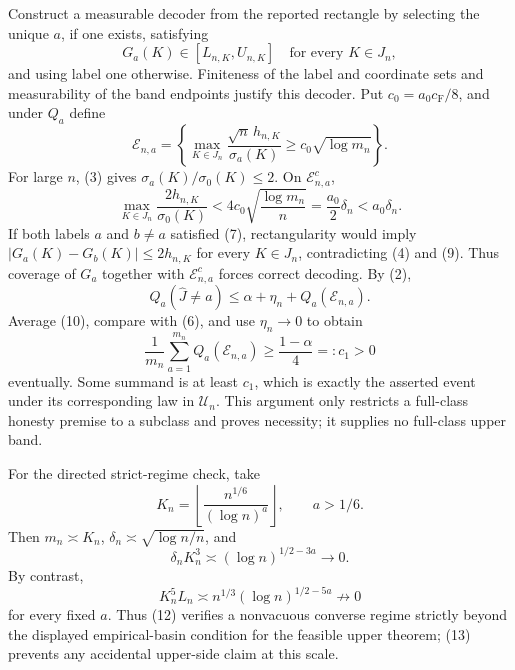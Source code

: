 Construct a measurable decoder from the reported rectangle by selecting the unique \(a\), if one exists, satisfying
\[
 G_a(K)\in[L_{n,K},U_{n,K}]\quad\text{for every }K\in J_n,                              \tag{7}
\]
and using label one otherwise.  Finiteness of the label and coordinate sets and measurability of the band endpoints justify this decoder.  Put \(c_0=a_0c_{\mathrm F}/8\), and under \(Q_a\) define
\[
 \mathcal E_{n,a}=\left\{\max_{K\in J_n}
 \frac{\sqrt n\,h_{n,K}}{\sigma_a(K)}\geq c_0\sqrt{\log m_n}\right\}.                \tag{8}
\]
For large \(n\), (3) gives \(\sigma_a(K)/\sigma_0(K)\leq2\).  On \(\mathcal E_{n,a}^c\),
\[
 \max_{K\in J_n}\frac{2h_{n,K}}{\sigma_0(K)}
 <4c_0\sqrt{\frac{\log m_n}{n}}=\frac{a_0}{2}\delta_n<a_0\delta_n.                    \tag{9}
\]
If both labels \(a\) and \(b\ne a\) satisfied (7), rectangularity would imply \(|G_a(K)-G_b(K)|\leq2h_{n,K}\) for every \(K\in J_n\), contradicting (4) and (9).  Thus coverage of \(G_a\) together with \(\mathcal E_{n,a}^c\) forces correct decoding.  By (2),
\[
 Q_a(\widehat J\ne a)\leq\alpha+\eta_n+Q_a(\mathcal E_{n,a}).                           \tag{10}
\]
Average (10), compare with (6), and use \(\eta_n\to0\) to obtain
\[
 \frac1{m_n}\sum_{a=1}^{m_n}Q_a(\mathcal E_{n,a})\geq\frac{1-\alpha}{4}=:c_1>0          \tag{11}
\]
eventually.  Some summand is at least \(c_1\), which is exactly the asserted event under its corresponding law in \(\mathcal U_n\).  This argument only restricts a full-class honesty premise to a subclass and proves necessity; it supplies no full-class upper band.

For the directed strict-regime check, take
\[
 K_n=\left\lfloor\frac{n^{1/6}}{(\log n)^a}\right\rfloor,\qquad a>1/6.
\]
Then \(m_n\asymp K_n\), \(\delta_n\asymp\sqrt{\log n/n}\), and
\[
 \delta_nK_n^3\asymp(\log n)^{1/2-3a}\to0.                                              \tag{12}
\]
By contrast,
\[
 K_n^5L_n\asymp n^{1/3}(\log n)^{1/2-5a}\not\to0                                      \tag{13}
\]
for every fixed \(a\).  Thus (12) verifies a nonvacuous converse regime strictly beyond the displayed empirical-basin condition for the feasible upper theorem; (13) prevents any accidental upper-side claim at this scale.